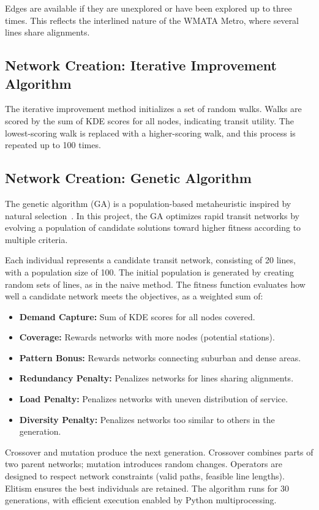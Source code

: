 \documentclass[manuscript]{acmart}
\begin{document}
Edges are available if they are unexplored or have been explored up to three times. This reflects the interlined nature of the WMATA Metro, where several lines share alignments.

\subsection{Network Creation: Iterative Improvement Algorithm}

The iterative improvement method initializes a set of random walks. Walks are scored by the sum of KDE scores for all nodes, indicating transit utility. The lowest-scoring walk is replaced with a higher-scoring walk, and this process is repeated up to 100 times.

\subsection{Network Creation: Genetic Algorithm}
The genetic algorithm (GA) is a population-based metaheuristic inspired by natural selection~\cite{bib:chien2001genetic, bib:dib2017ga}. In this project, the GA optimizes rapid transit networks by evolving a population of candidate solutions toward higher fitness according to multiple criteria.

Each individual represents a candidate transit network, consisting of 20 lines, with a population size of 100. The initial population is generated by creating random sets of lines, as in the naive method. The fitness function evaluates how well a candidate network meets the objectives, as a weighted sum of:
\begin{itemize}
    \item \textbf{Demand Capture:} Sum of KDE scores for all nodes covered.
    \item \textbf{Coverage:} Rewards networks with more nodes (potential stations).
    \item \textbf{Pattern Bonus:} Rewards networks connecting suburban and dense areas.
    \item \textbf{Redundancy Penalty:} Penalizes networks for lines sharing alignments.
    \item \textbf{Load Penalty:} Penalizes networks with uneven distribution of service.
    \item \textbf{Diversity Penalty:} Penalizes networks too similar to others in the generation.
\end{itemize}

Crossover and mutation produce the next generation. Crossover combines parts of two parent networks; mutation introduces random changes. Operators are designed to respect network constraints (valid paths, feasible line lengths). Elitism ensures the best individuals are retained. The algorithm runs for 30 generations, with efficient execution enabled by Python multiprocessing.
\end{document}
